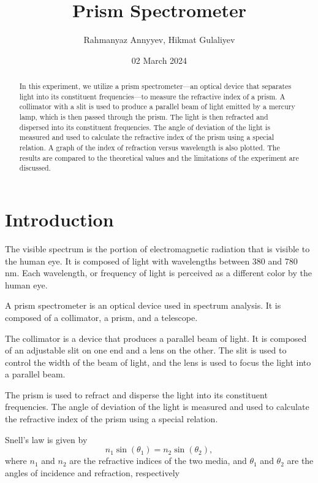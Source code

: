 \documentclass[10pt]{article}
\title{Prism Spectrometer}
\author{Rahmanyaz Annyyev, Hikmat Gulaliyev}
\date{02 March 2024}
\begin{document}
\maketitle

\begin{abstract}
In this experiment, we utilize a prism spectrometer---an optical device that separates light into its constituent frequencies---to measure the refractive index of a prism. A collimator with a slit is used to produce a parallel beam of light emitted by a mercury lamp, which is then passed through the prism. The light is then refracted and dispersed into its constituent frequencies. The angle of deviation of the light is measured and used to calculate the refractive index of the prism using a special relation. A graph of the index of refraction versus wavelength is also plotted. The results are compared to the theoretical values and the limitations of the experiment are discussed.
\end{abstract}

\section{Introduction}
The visible spectrum is the portion of electromagnetic radiation that is visible to the human eye. It is composed of light with wavelengths between 380 and 780 nm. Each wavelength, or frequency of light is perceived as a different color by the human eye\cite{Marcus_1998}. 



A prism spectrometer is an optical device used in spectrum analysis. It is composed of a collimator, a prism, and a telescope.

The collimator is a device that produces a parallel beam of light. It is composed of an adjustable slit on one end and a lens on the other. The slit is used to control the width of the beam of light, and the lens is used to focus the light into a parallel beam. 

The prism is used to refract and disperse the light into its constituent frequencies. The angle of deviation of the light is measured and used to calculate the refractive index of the prism using a special relation.

Snell's law is given by
\begin{equation}
    n_1 \sin(\theta_1) = n_2 \sin(\theta_2),
\end{equation}
where $n_1$ and $n_2$ are the refractive indices of the two media, and $\theta_1$ and $\theta_2$ are the angles of incidence and refraction, respectively
\end{document}
